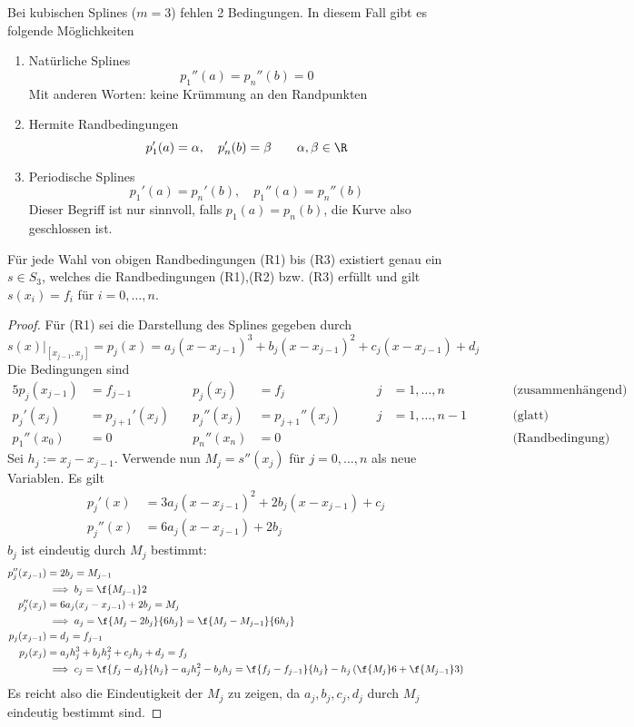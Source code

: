 \documentclass[11pt]{scrartcl}
\begin{document}
Bei kubischen Splines ($m=3$) fehlen 2 Bedingungen.
In diesem Fall gibt es folgende Möglichkeiten
\begin{enumerate}[{(R}1{)}]
	\item
		Natürliche Splines
		\[
			p_1''(a) = p_n''(b)=0
		\]
		Mit anderen Worten: keine Krümmung an den Randpunkten
	\item
		Hermite Randbedingungen
		\[
			p_1'(a) = \alpha, \quad p_n'(b) = \beta \qquad \alpha,\beta\in \R
		\]
	\item
		Periodische Splines
		\[
			p_1'(a) = p_n'(b), \quad p_1''(a) = p_n''(b)
		\]
		Dieser Begriff ist nur sinnvoll, falls $p_1(a) = p_n(b)$, die Kurve also geschlossen ist.
\end{enumerate}

\begin{st}
	\label{1.32}
	Für jede Wahl von obigen Randbedingungen (R1) bis (R3) existiert genau ein $s\in S_3$, welches die Randbedingungen (R1),(R2) bzw. (R3) erfüllt und gilt $s(x_i)=f_i$ für $i=0,\dotsc,n$.
	\begin{proof}
		Für (R1) sei die Darstellung des Splines gegeben durch
		\[
			s(x)\big|_{[x_{j-1},x_j]} = p_j(x) = a_j(x-x_{j-1})^3 + b_j(x-x_{j-1})^2 + c_j(x-x_{j-1}) + d_j
		\]
		Die Bedingungen sind
		\begin{alignat*}{5}
			p_j(x_{j-1}) &= f_{j-1}& \quad p_j(x_j) &= f_j & \qquad j&=1,\dotsc,n & &\qquad \text{(zusammenhängend)} &\\
			p_j'(x_j) &= p_{j+1}'(x_j) & \quad p_j''(x_j) &= p_{j+1}''(x_j) &  \qquad j&=1,\dotsc,n-1 & &\qquad \text{(glatt)} &\\
			p_1''(x_0)&=0& \quad p_n''(x_n) &= 0 & & & &\qquad \text{(Randbedingung)} &
		\end{alignat*}
		Sei $h_j := x_j - x_{j-1}$.
		Verwende nun $M_j = s''(x_j)$ für $j=0,\dotsc,n$ als neue Variablen.
		Es gilt
		\begin{align*}
			p_j'(x) &= 3a_j(x-x_{j-1})^2 + 2b_j(x-x_{j-1})+c_j \\
			p_j''(x) &= 6a_j(x-x_{j-1}) + 2b_j
		\end{align*}
		$b_j$ ist eindeutig durch $M_j$ bestimmt:
		\begin{align*}
			p_j''(x_{j-1}) 
				&= 2b_j 
				= M_{j-1}  \\
				&\implies b_j
					=\f {M_{j-1}}2 \\
			p_j''(x_j) 
				&= 6a_j(x_j-x_{j-1}) + 2b_j 
				= M_j \\
				&\implies a_j 
					= \f {M_j - 2b_j}{6h_j} 
					= \f {M_j - M_{j-1}}{6h_j} \\
			p_j(x_{j-1}) 
				&= d_j 
				= f_{j-1} \\
			p_j(x_j) 
				&= a_j h_j^3 + b_jh_j^2 + c_jh_j + d_j 
				= f_j \\
				&\implies c_j 
					= \f{f_j-d_j}{h_j} - a_jh_j^2 - b_jh_j 
					= \f {f_j-f_{j-1}}{h_j} - h_j\left(\f {M_j}6 + \f{M_{j-1}}3 \right)
		\end{align*}
		Es reicht also die Eindeutigkeit der $M_j$ zu zeigen, da $a_j,b_j,c_j,d_j$ durch $M_j$ eindeutig bestimmt sind.


\end{proof}
\end{st}
\end{document}
